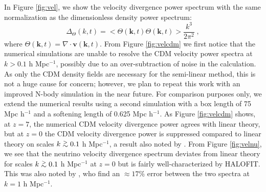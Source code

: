 \documentclass[twocolumn,superscriptaddress,prd]{revtex4}
\def\gtsima{$\; \buildrel > \over \sim \;$}
\def\gsim{\lower.5ex\hbox{\gtsima}}
\newcommand{\halofitns}{HALOFIT}
\begin{document}
In Figure \ref{fig:vel}, we show the velocity divergence power
spectrum with the same normalization as the dimensionless density power spectrum:
\begin{equation}
  \Delta_\Theta(k,t) = <\Theta(\mathbf{k},t) \Theta(\mathbf{k},t)>  \frac{k^3}{2 \pi^2}  \;,
\end{equation}
where $\Theta(\mathbf{k},t) = \nabla \cdot \mathbf{v}(\mathbf{k},t)
$. 
From Figure \ref{fig:velcdm} we first notice that the numerical
simulations are unable to resolve the CDM velocity power
spectra at $k > 0.1 $ h Mpc$^{-1}$, possibly due to an
over-subtraction of noise in the calculation.
As only the CDM density fields are
necessary for the semi-linear method, this is
not a huge cause for concern; however, we plan to repeat this work
with an improved N-body simulation in the near future.
For comparison purposes only, we extend the numerical results using 
a second simulation with a 
box length of 75 Mpc h$^{-1}$ and a softening length of 0.625
Mpc h$^{-1}$.  
As Figure \ref{fig:velcdm} shows, at $z=7$, the numerical CDM velocity divergence power agrees with 
linear theory, but at $z=0$ 
the CDM velocity divergence power is suppressed 
compared to linear theory on scales $k\gsim0.1$ h Mpc$^{-1}$, a result also noted by \cite{inman15}.  
From Figure \ref{fig:velnu}, we see that the neutrino velocity
divergence spectrum deviates from linear theory for scales $k \gsim
0.1$ h Mpc$^{-1}$ at $z=0$ but 
is fairly well-characterized by \halofitns.  This was also noted by \cite{inman15}, who find
an $\approx 17$\% error between the two spectra at $k=1$ h
Mpc$^{-1}$. 
\end{document}
